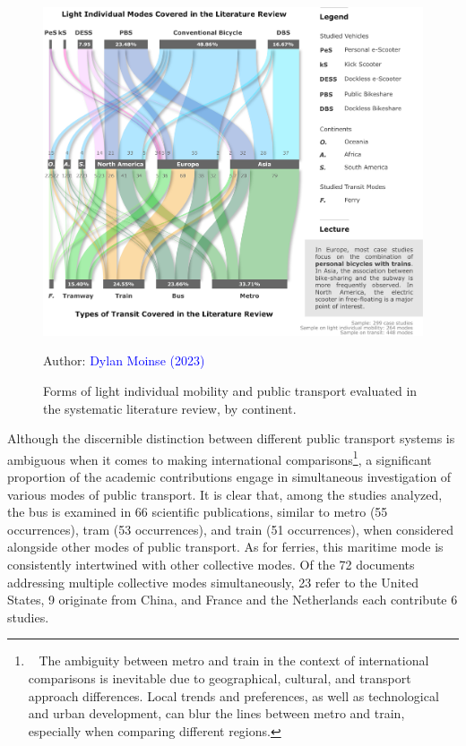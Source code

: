 \begin{refsegment}
    \begin{figure}[h!]\vspace*{4pt}
        \caption{Forms of light individual mobility and public transport evaluated in the systematic literature review, by continent.}
        \label{fig-chap2:MIL-TC-continents}
        \centerline{\includegraphics[width=1\columnwidth]{src/Figures/Chap-2/EN_RSL_MIL_TC_Continents.pdf}}
        \vspace{5pt}
        \begin{flushright}\scriptsize{
        Author: \textcolor{blue}{Dylan Moinse (2023)}
        }\end{flushright}
    \end{figure}

    Although the discernible distinction between different public transport systems is ambiguous when it comes to making international comparisons\footnote{~
    The ambiguity between metro and train in the context of international comparisons is inevitable due to geographical, cultural, and transport approach differences. Local trends and preferences, as well as technological and urban development, can blur the lines between metro and train, especially when comparing different regions.
}, a significant proportion of the academic contributions engage in simultaneous investigation of various modes of public transport. It is clear that, among the studies analyzed, the bus is examined in 66 scientific publications, similar to metro (55 occurrences), tram (53 occurrences), and train (51 occurrences), when considered alongside other modes of public transport. As for ferries, this maritime mode is consistently intertwined with other collective modes. Of the 72 documents addressing multiple collective modes simultaneously, 23 refer to the United States, 9 originate from China, and France and the Netherlands each contribute 6 studies.%


\end{refsegment}
